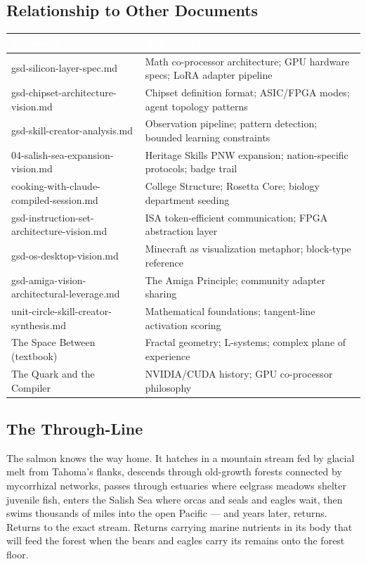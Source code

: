 \documentclass[11pt,letterpaper]{article}
\newcommand{\tableheader}[1]{\textbf{\sffamily\textcolor{white}{#1}}}
\begin{document}
\subsection{Relationship to Other Documents}

\begin{center}
\begin{tabularx}{\textwidth}{L{4.5cm}X}
\toprule
{}
\tableheader{Document} & \tableheader{Relationship} \\
\midrule
gsd-silicon-layer-spec.md & Math co-processor architecture; GPU hardware specs; LoRA adapter pipeline \\
gsd-chipset-architecture-vision.md & Chipset definition format; ASIC/FPGA modes; agent topology patterns \\
gsd-skill-creator-analysis.md & Observation pipeline; pattern detection; bounded learning constraints \\
04-salish-sea-expansion-vision.md & Heritage Skills PNW expansion; nation-specific protocols; badge trail \\
cooking-with-claude-compiled-session.md & College Structure; Rosetta Core; biology department seeding \\
gsd-instruction-set-architecture-vision.md & ISA token-efficient communication; FPGA abstraction layer \\
gsd-os-desktop-vision.md & Minecraft as visualization metaphor; block-type reference \\
gsd-amiga-vision-architectural-leverage.md & The Amiga Principle; community adapter sharing \\
unit-circle-skill-creator-synthesis.md & Mathematical foundations; tangent-line activation scoring \\
The Space Between (textbook) & Fractal geometry; L-systems; complex plane of experience \\
The Quark and the Compiler & NVIDIA/CUDA history; GPU co-processor philosophy \\
\bottomrule
\end{tabularx}
\end{center}

\subsection{The Through-Line}

The salmon knows the way home. It hatches in a mountain stream fed by glacial melt from Tahoma's flanks, descends through old-growth forests connected by mycorrhizal networks, passes through estuaries where eelgrass meadows shelter juvenile fish, enters the Salish Sea where orcas and seals and eagles wait, then swims thousands of miles into the open Pacific --- and years later, returns. Returns to the exact stream. Returns carrying marine nutrients in its body that will feed the forest when the bears and eagles carry its remains onto the forest floor.
\end{document}
